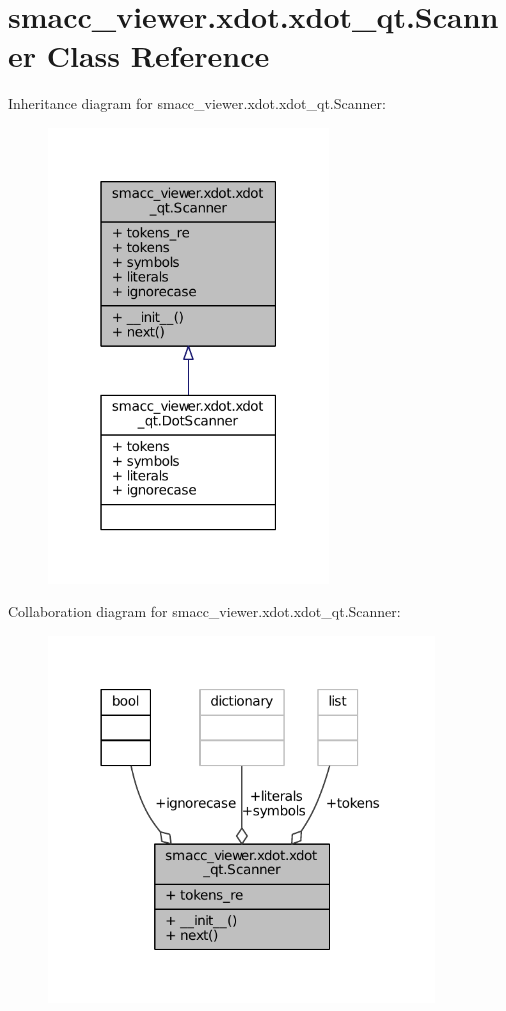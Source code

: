 \hypertarget{classsmacc__viewer_1_1xdot_1_1xdot__qt_1_1Scanner}{}\section{smacc\+\_\+viewer.\+xdot.\+xdot\+\_\+qt.\+Scanner Class Reference}
\label{classsmacc__viewer_1_1xdot_1_1xdot__qt_1_1Scanner}


Inheritance diagram for smacc\+\_\+viewer.\+xdot.\+xdot\+\_\+qt.\+Scanner\+:
\nopagebreak
\begin{figure}[H]
\begin{center}
\leavevmode
\includegraphics[width=211pt]{classsmacc__viewer_1_1xdot_1_1xdot__qt_1_1Scanner__inherit__graph}
\end{center}
\end{figure}


Collaboration diagram for smacc\+\_\+viewer.\+xdot.\+xdot\+\_\+qt.\+Scanner\+:
\nopagebreak
\begin{figure}[H]
\begin{center}
\leavevmode
\includegraphics[width=290pt]{classsmacc__viewer_1_1xdot_1_1xdot__qt_1_1Scanner__coll__graph}
\end{center}
\end{figure}
